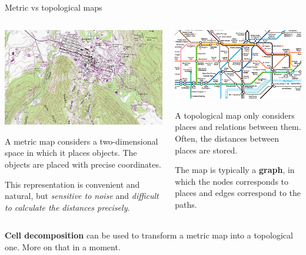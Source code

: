 \documentclass[compress,xcolor=table]{beamer}
\begin{document}
\begin{frame}{Metric vs topological maps}

    \begin{columns}
        \begin{column}{0.5\linewidth}

            \begin{center}
                \includegraphics[width=0.8\linewidth]{map}
            \end{center}

            \small
            A metric map considers a two-dimensional space in which it places objects. The
            objects are placed with precise coordinates.

            This representation is convenient and natural, but \emph{sensitive to noise}
            and \emph{difficult to calculate the distances precisely}.

        \end{column}
        \begin{column}{0.5\linewidth}

            \begin{center}
                \includegraphics[width=0.8\linewidth]{tubemap}
            \end{center}

            \small
            A topological map only considers places and
            relations between them. Often, the distances between places
            are stored.

            The map is typically a \textbf{graph}, in which the nodes
            corresponds to places and edges correspond to the paths.
        \end{column}
    \end{columns}

    \normalsize

    \pause
    \textbf{Cell decomposition} can be used to transform a metric map into a
    topological one. More on that in a moment.

\end{frame}
\end{document}
